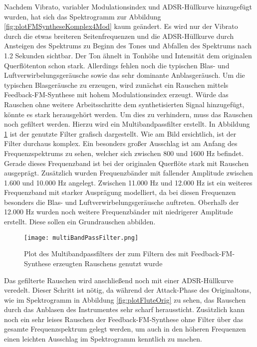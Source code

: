 Nachdem Vibrato, variabler Modulationsindex und ADSR-Hüllkurve hinzugefügt wurden, hat sich das Spektrogramm zur Abbildung \ref{fig:plotFMSyntheseKomplex4Mod} kaum geändert. Es wird nur der Vibrato durch die etwas breiteren Seitenfrequenzen und die ADSR-Hüllkurve durch Ansteigen des Spektrums zu Beginn des Tones und Abfallen des Spektrums nach 1.2 Sekunden sichtbar. Der Ton ähnelt in Tonhöhe und Intensität dem originalen Querflötenton schon stark. Allerdings fehlen noch die typischen Blas- und Luftverwirbelungsgeräusche sowie das sehr dominante Anblasgeräusch. Um die typischen Blasgeräusche zu erzeugen, wird zunächst ein Rauschen mittels Feedback-FM-Synthese mit hohem Modulationsindex erzeugt. Würde das Rauschen ohne weitere Arbeitsschritte dem synthetisierten Signal hinzugefügt, könnte es stark herausgehört werden. Um dies zu verhindern, muss das Rauschen noch gefiltert werden. Hierzu wird ein Multibandpassfilter erstellt. In Abbildung \ref{fig:multiBandPassFilter} ist der genutzte Filter grafisch dargestellt. Wie am Bild ersichtlich, ist der Filter durchaus komplex. Ein besonders großer Ausschlag ist am Anfang des Frequenzspektrums zu sehen, welcher sich zwischen 800 und 1600 Hz befindet. Gerade dieses Frequenzband ist bei der originalen Querflöte stark mit Rauschen ausgeprägt. Zusätzlich wurden Frequenzbänder mit fallender Amplitude zwischen 1.600 und 10.000 Hz angelegt. Zwischen 11.000 Hz und 12.000 Hz ist ein weiteres Frequenzband mit starker Ausprägung modelliert, da bei diesen Frequenzen besonders die Blas- und Luftverwirbelungsgeräusche auftreten. Oberhalb der 12.000 Hz wurden noch weitere Frequenzbänder mit niedrigerer Amplitude erstellt. Diese sollen ein Grundrauschen abbilden.

\begin{figure} [h!t!b!]
\centering
  \texttt{[image: multiBandPassFilter.png]}
\caption{Plot des Multibandpassfilters der zum Filtern des mit Feedback-FM-Synthese erzeugten Rauschens genutzt wurde}
\label{fig:multiBandPassFilter}
\end{figure}

Das gefilterte Rauschen wird anschließend noch mit einer ADSR-Hüllkurve veredelt. Dieser Schritt ist nötig, da während der Attack-Phase des Originaltons, wie im Spektrogramm in Abbildung \ref{fig:plotFluteOrig} zu sehen, das Rauschen durch das Anblasen des Instrumentes sehr scharf heraussticht. Zusätzlich kann noch ein sehr leises Rauschen der Feedback-FM-Synthese ohne Filter über das gesamte Frequenzspektrum gelegt werden, um auch in den höheren Frequenzen einen leichten Ausschlag im Spektrogramm kenntlich zu machen. 

